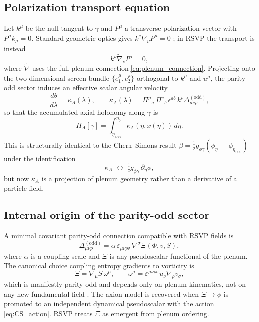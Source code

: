 \documentclass[12pt]{article}
\theoremstyle{definition}
\newcommand{\kA}{\kappa_A}
\newcommand{\etaLSS}{\eta_{\mathrm{LSS}}}
\newcommand{\etaobs}{\eta_0}
\newcommand{\gpg}{g_{\phi\gamma}}
\begin{document}
\subsection{Polarization transport equation}

Let $k^\mu$ be the null tangent to $\gamma$ and $P^\mu$ a transverse
polarization vector with $P^\mu k_\mu=0$.
Standard geometric optics gives $k^\nu\nabla_\nu P^\mu=0$
\cite{MisnerThorneWheeler,Grasso2018,Oancea2020};
in RSVP the transport is instead
\begin{equation}
  k^\nu\widetilde{\nabla}_\nu P^\mu = 0,
\end{equation}
where $\widetilde{\nabla}$ uses the full plenum connection
\eqref{eq:plenum_connection}.
Projecting onto the two-dimensional screen bundle
$\{e_1^\mu,e_2^\mu\}$ orthogonal to $k^\mu$ and $u^\mu$, the parity-odd
sector induces an effective scalar angular velocity
\begin{equation}
  \frac{d\theta}{d\lambda} = \kA(\lambda),
  \qquad
  \kA(\lambda)
  = \Pi^\mu{}_a\,\Pi^\nu{}_b\,\epsilon^{ab}\,k^\rho
    \Delta_{\mu\nu\rho}^{(\mathrm{odd})},
  \label{eq:kA_def}
\end{equation}
so that the accumulated axial holonomy along $\gamma$ is
\begin{equation}
  \boxed{
  H_A[\gamma]
  = \int_{\etaLSS}^{\etaobs}
    \kA(\eta,x(\eta))\,d\eta.}
  \label{eq:holonomy}
\end{equation}
This is structurally identical to the Chern--Simons result
$\beta=\frac{1}{2}\gpg(\phi_{\etaobs}-\phi_{\etaLSS})$
under the identification
\begin{equation}
  \kA \;\longleftrightarrow\; \tfrac{1}{2}\gpg\,\partial_\eta\phi,
  \label{eq:identification}
\end{equation}
but now $\kA$ is a projection of plenum geometry rather than a derivative
of a particle field.

\subsection{Internal origin of the parity-odd sector}

A minimal covariant parity-odd connection compatible with RSVP fields is
\begin{equation}
  \Delta^{(\mathrm{odd})}_{\mu\nu\rho}
  = \alpha\,\varepsilon_{\mu\nu\rho\sigma}\,\nabla^\sigma\Xi(\Phi,v,S),
  \label{eq:Delta_odd}
\end{equation}
where $\alpha$ is a coupling scale and $\Xi$ is any pseudoscalar functional
of the plenum.
The canonical choice coupling entropy gradients to vorticity is
\begin{equation}
  \Xi = \nabla_\mu S\,\omega^\mu,
  \qquad
  \omega^\mu = \varepsilon^{\mu\nu\rho\sigma}u_\nu\nabla_\rho v_\sigma,
  \label{eq:Xi}
\end{equation}
which is manifestly parity-odd and depends only on plenum kinematics,
not on any new fundamental field
\cite{Alexander2009,Nair2010,Maleknejad2013}.
The axion model is recovered when $\Xi\to\phi$ is promoted to an independent
dynamical pseudoscalar with the action \eqref{eq:CS_action}.
RSVP treats $\Xi$ as emergent from plenum ordering.
\end{document}
